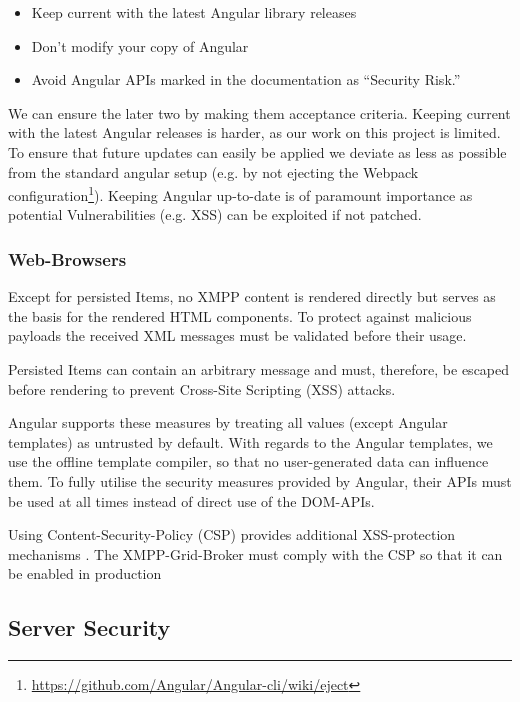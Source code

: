 \begin{itemize}
    \item Keep current with the latest Angular library releases
    \item Don't modify your copy of Angular
    \item Avoid Angular APIs marked in the documentation as “Security Risk.”
\end{itemize}

We can ensure the later two by making them acceptance criteria.
Keeping current with the latest Angular releases is harder, as our work on this project is limited.
To ensure that future updates can easily be applied we deviate as less as possible from the standard angular setup (e.g. by not ejecting the Webpack configuration\footnote{\url{https://github.com/Angular/Angular-cli/wiki/eject}}).
Keeping Angular up-to-date is of paramount importance as potential Vulnerabilities (e.g. XSS) can be exploited if not patched. \cite{angular-security}

\subsubsection{Web-Browsers}

Except for persisted Items, no XMPP content is rendered directly but serves as the basis for the rendered HTML components.
To protect against malicious payloads the received XML messages must be validated before their usage. %

Persisted Items can contain an arbitrary message and must, therefore, be escaped before rendering to prevent Cross-Site Scripting (XSS) attacks.

Angular supports these measures by treating all values (except Angular templates) as untrusted by default.
With regards to the Angular templates, we use the offline template compiler, so that no user-generated data can influence them. To fully utilise the security measures provided by Angular, their APIs must be used at all times instead of direct use of the DOM-APIs.\cite{} 

Using Content-Security-Policy (CSP) provides additional XSS-protection mechanisms \cite{w3c-csp}.
The XMPP-Grid-Broker must comply with the CSP so that it can be enabled in production

\subsection{Server Security}

